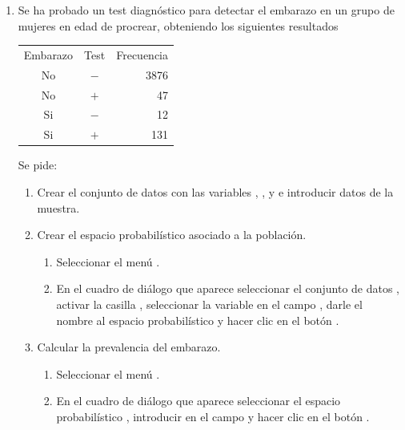 \begin{enumerate}[leftmargin=*]
\item Se ha probado un test diagnóstico para detectar el embarazo en un grupo de mujeres en edad de procrear, obteniendo los siguientes
resultados
\begin{center}
\begin{tabular}{ccr}
\hline
Embarazo & Test & Frecuencia\\ 
No & $-$ & 3876\\
No & $+$ & 47\\
Si & $-$ & 12\\
Si & $+$ & 131\\
\hline
\end{tabular}
\end{center}
Se pide:
\begin{enumerate}
\item Crear el conjunto de datos  con las variables , , y  e
introducir datos de la muestra.
\item Crear el espacio probabilístico asociado a la población.
\begin{indicacion}{
\begin{enumerate}
\item Seleccionar el menú .
\item En el cuadro de diálogo que aparece seleccionar el conjunto de datos , activar la casilla
, seleccionar la variable  en el campo , darle el nombre
 al espacio probabilístico y hacer clic en el botón .
\end{enumerate}
}
\end{indicacion}  

\item Calcular la prevalencia del embarazo.
\begin{indicacion}{
\begin{enumerate}
\item Seleccionar el menú .
\item En el cuadro de diálogo que aparece seleccionar el espacio probabilístico , introducir
 en el campo  y hacer clic en el botón .
\end{enumerate}
}
\end{indicacion} 


\end{enumerate}
\end{enumerate}
